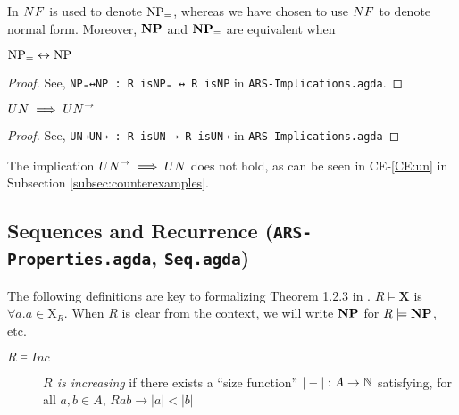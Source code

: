 In \terese $\NF$ is used to denote $\mathrm{NP_=}$, whereas we have chosen to use $\NF$ to denote normal form. Moreover, ${\mathbf{NP}}$ and ${\mathbf{NP_=}}$ are equivalent when 

\begin{proposition}
    $\mathrm{NP_=} \leftrightarrow \mathrm{NP}$ 
\end{proposition}
\begin{proof}
    See, \verb|NP₌↔NP : R isNP₌ ↔ R isNP| in \texttt{ARS-Implications.agda}.
\end{proof}
\begin{proposition}
    $\UN \implies \UNto $
\end{proposition}
\begin{proof}
    See, \verb|UN→UN→ : R isUN → R isUN→| in \texttt{ARS-Implications.agda}
\end{proof}
The implication $\UNto \implies \UN$ does not hold, as can be seen in CE-\ref{CE:un} in Subsection \ref{subsec:counterexamples}.
\subsection{Sequences and Recurrence (\texttt{ARS-Properties.agda}, \texttt{Seq.agda})}
The following definitions are key to formalizing Theorem 1.2.3 in \terese.
$R \models \mathbf{X}$ is $\forall a. a \in \mathrm{X}_R$. When $R$ is clear from the context, we will write $\mathbf{NP}$ for $R \models \mathbf{NP}$, etc. 

\begin{definition}
    \begin{description}
        \item[$R \models Inc$] \emph{$R$ is increasing} if there exists a ``size function'' $|-| : A \to \mathbb{N}$ satisfying, for all $a, b \in A$,
        $Rab \to |a| < |b|$  
    \end{description}
\end{definition}


